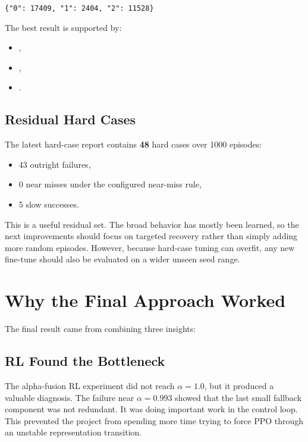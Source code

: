 \documentclass[11pt]{article}
\begin{document}
\begin{center}
\texttt{\{"0": 17409, "1": 2404, "2": 11528\}}
\end{center}

The best result is supported by:

\begin{itemize}
  \item {},
  \item {},
  \item {}.
\end{itemize}

\subsection{Residual Hard Cases}

The latest hard-case report contains \textbf{48} hard cases over 1000
episodes:

\begin{itemize}
  \item 43 outright failures,
  \item 0 near misses under the configured near-miss rule,
  \item 5 slow successes.
\end{itemize}

This is a useful residual set. The broad behavior has mostly been learned, so
the next improvements should focus on targeted recovery rather than simply
adding more random episodes. However, because hard-case tuning can overfit, any
new fine-tune should also be evaluated on a wider unseen seed range.

\section{Why the Final Approach Worked}

The final result came from combining three insights:

\subsection{RL Found the Bottleneck}

The alpha-fusion RL experiment did not reach \(\alpha = 1.0\), but it produced
a valuable diagnosis. The failure near \(\alpha = 0.993\) showed that the last
small fallback component was not redundant. It was doing important work in the
control loop. This prevented the project from spending more time trying to
force PPO through an unstable representation transition.
\end{document}
